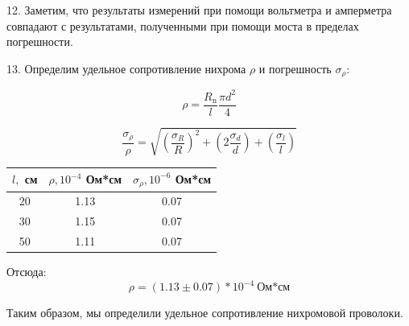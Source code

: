 \documentclass[14pt]{article}
\begin{document}
	
	\vspace{0.5cm}
	12. Заметим, что результаты измерений при помощи вольтметра и амперметра совпадают с результатами, полученными при помощи
	моста в пределах погрешности.
	
	\vspace{0.5cm}
	13. Определим удельное сопротивление нихрома $\rho$ и погрешность $\sigma_\rho$:
	
	$$\rho = \frac{R_\text{n}}{l}\frac{\pi d^2}{4}$$
	
	$$\frac{\sigma_\rho}{\rho} = \sqrt{\left(\frac{\sigma_R}{R}\right)^2 + \left(2\frac{\sigma_d}{d}\right) + 
	\left(\frac{\sigma_l}{l}\right)}$$	
	
	\vspace{0.5cm}
	\begin{center}
	\begin{tabular}{|c|c|c|}
	\hline
	$l,$ см 	& $\rho, 10^{-4}$ Ом*см 	& $\sigma_\rho, 10^{-6}$ Ом*см\\
	\hline
	20			& 1.13 						& 0.07\\
	\hline
	30			& 1.15						& 0.07\\
	\hline
	50			& 1.11						& 0.07\\ 
	\hline
	\end{tabular}
	\end{center}
	
	\vspace{1cm}
	Отсюда:	
	$$\boxed{\boxed{\rho = (1.13 \pm 0.07)*10^{-4}~\text{Ом*см}}}$$
	
	\vspace{1cm}
	Таким образом, мы определили удельное сопротивление нихромовой проволоки. 
	
\end{document}
